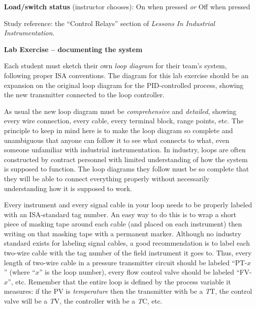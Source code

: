 \vskip 20pt

\noindent
{\bf Load/switch status} (instructor chooses): \hskip 20pt \underbar{\hskip 20pt} On when pressed \hskip 10pt {\it or} \hskip 10pt \underbar{\hskip 20pt} Off when pressed

\vfil

Study reference: the ``Control Relays'' section of {\it Lessons In Industrial Instrumentation}.







\vfil \eject

\noindent
{\bf Lab Exercise -- documenting the system}

\vskip 5pt

Each student must sketch their own {\it loop diagram} for their team's system, following proper ISA conventions.  The diagram for this lab exercise should be an expansion on the original loop diagram for the PID-controlled process, showing the new transmitter connected to the loop controller.

As usual the new loop diagram must be {\it comprehensive} and {\it detailed}, showing every wire connection, every cable, every terminal block, range points, etc.  The principle to keep in mind here is to make the loop diagram so complete and unambiguous that anyone can follow it to see what connects to what, even someone unfamiliar with industrial instrumentation.  In industry, loops are often constructed by contract personnel with limited understanding of how the system is supposed to function.  The loop diagrams they follow must be so complete that they will be able to connect everything properly without necessarily understanding how it is supposed to work.

Every instrument and every signal cable in your loop needs to be properly labeled with an ISA-standard tag number.  An easy way to do this is to wrap a short piece of masking tape around each cable (and placed on each instrument) then writing on that masking tape with a permanent marker.  Although no industry standard exists for labeling signal cables, a good recommendation is to label each two-wire cable with the tag number of the field instrument it goes to.  Thus, every length of two-wire cable in a pressure transmitter circuit should be labeled ``PT-$x$'' (where ``$x$'' is the loop number), every flow control valve should be labeled ``FV-$x$'', etc.  Remember that the entire loop is defined by the process variable it measures: if the PV is {\it temperature} then the transmitter with be a {\it T}T, the control valve will be a {\it T}V, the controller with be a {\it T}C, etc.


